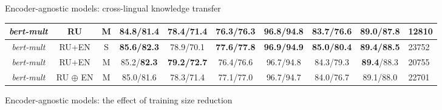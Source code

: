 \begin{frame}{Encoder-agnostic models: cross-lingual knowledge transfer}
{\begin{tabular}{|c|c|c||c|c|c|c|c|c|}
\textit{bert-mult} & RU & M & \textbf{84.8/81.4} & \textbf{78.4/71.4} & 76.3/76.3 & 96.8/94.8 & 83.7/\textbf{76.6} & \textbf{89.0/87.8} & 12810 \\ 
 \hline
\textit{bert-mult} & RU+EN & S & \textbf{85.6/82.3} & 78.9/70.1 & \textbf{77.6/77.8} & \textbf{96.9/94.9} & \textbf{85.0/80.4} & \textbf{89.4/88.5} & 23752 \\ 
\textit{bert-mult} & RU+EN & M & 85.2/\textbf{82.3} & \textbf{79.2/72.7} & 76.4/76.6 & 96.7/94.8 & 84.3/79.3 & \textbf{89.4}/88.3 & 20755 \\ 
\textit{bert-mult} & RU $\oplus$ EN & M & 85.0/81.6 & 78.3/71.4 & 77.1/77.0 & 96.7/94.7 & 84.0/76.7 & 89.1/88.0 & 22701 \\ \hline
\end{tabular}}

\end{frame}


\begin{frame}{Encoder-agnostic models: the effect of training size reduction}
\begin{table}[htbp]
\caption{Average accuracy on the Russian data for \textit{distilbert-base-multilingual-cased}, batch size 160, plain sampling. 'S' stands for single-task mode, 'M' stands for multi-task mode, 'RU share' means the share of Russian training data, 'RU' means training only on the given percentage of Russian data, 'RU+EN' means training on the given percentage of Russian data with added full size English data.}
\end{table}
\end{frame}

